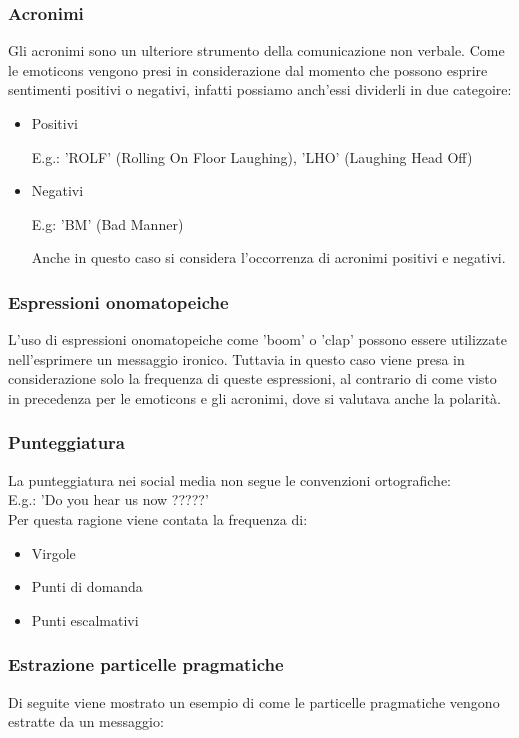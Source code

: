 \documentclass[oneside]{book}
\begin{document}
\subsubsection{Acronimi}
Gli acronimi sono un ulteriore strumento della comunicazione non verbale. Come le emoticons vengono presi in considerazione dal momento che possono esprire sentimenti positivi o negativi, infatti possiamo anch'essi dividerli in due categoire:

\begin{itemize}
	\item
	Positivi
	
	E.g.: 'ROLF' (Rolling On Floor Laughing), 'LHO' (Laughing Head Off)
	\item
	Negativi
	
	E.g: 'BM' (Bad Manner)
	
Anche in questo caso si considera l'occorrenza di acronimi positivi e negativi.
\end{itemize}

\subsubsection{Espressioni onomatopeiche}
L'uso di espressioni onomatopeiche come 'boom' o 'clap' possono essere utilizzate nell'esprimere un messaggio ironico. Tuttavia in questo caso viene presa in considerazione solo la frequenza di queste espressioni, al contrario di come visto in precedenza per le emoticons e gli acronimi, dove si valutava anche la polarità.

\subsubsection{Punteggiatura}
La punteggiatura nei social media non segue le convenzioni ortografiche:\\
E.g.: 'Do you hear us now ?????'\\
Per questa ragione viene contata la frequenza di:
\begin{itemize}
	\item Virgole
	
	\item Punti di domanda
	
	\item Punti escalmativi
\end{itemize}

\subsubsection{Estrazione particelle pragmatiche}
Di seguite viene mostrato un esempio di come le particelle pragmatiche vengono estratte da un messaggio:
\end{document}
